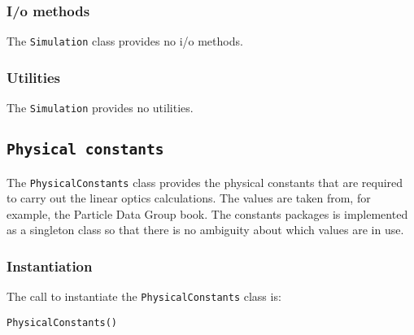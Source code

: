 \subsubsection{I/o methods}
\noindent
The \texttt{Simulation} class provides no i/o methods.

\subsubsection{Utilities}
\noindent
The \texttt{Simulation} provides no utilities.

\FloatBarrier

\subsection{\texttt{Physical constants}}
\label{SubSect:PhysCnsts}

The \texttt{PhysicalConstants} class provides the physical constants
that are required to carry out the linear optics calculations. 
The values are taken from, for example, the Particle Data Group book.
The constants packages is implemented as a singleton class so that
there is no ambiguity about which values are in use. 

\subsubsection{Instantiation}
\noindent
The call to instantiate the \texttt{PhysicalConstants} class is:
\begin{center}
  \texttt{PhysicalConstants()}
\end{center}

